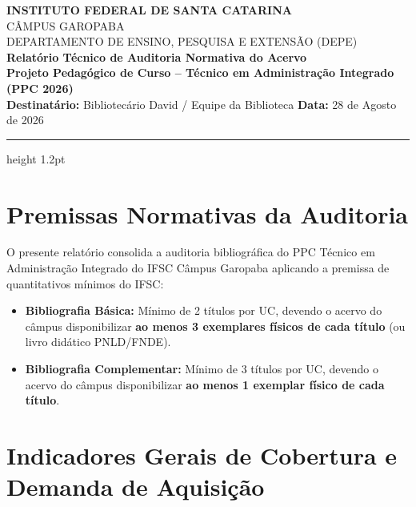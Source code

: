 \documentclass[10pt,a4paper]{article}
\begin{document}
\begin{center}
    {\large \textbf{INSTITUTO FEDERAL DE SANTA CATARINA}}\\[2pt]
    {\normalsize CÂMPUS GAROPABA}\\[2pt]
    {\small DEPARTAMENTO DE ENSINO, PESQUISA E EXTENSÃO (DEPE)}\\[10pt]
    
    {\LARGE \textbf{\textcolor{ifscgreen}{Relatório Técnico de Auditoria Normativa do Acervo}}}\\[4pt]
    {\large \textbf{Projeto Pedagógico de Curso -- Técnico em Administração Integrado (PPC 2026)}}\\[6pt]
    {\small \textbf{Destinatário:} Bibliotecário David / Equipe da Biblioteca \quad \textbullet{} \quad \textbf{Data:} 28 de Agosto de 2026}
\end{center}

\vspace{0.2cm}
\hrule height 1.2pt \relax
\vspace{0.3cm}

\section{Premissas Normativas da Auditoria}
O presente relatório consolida a auditoria bibliográfica do PPC Técnico em Administração Integrado do IFSC Câmpus Garopaba aplicando a premissa de quantitativos mínimos do IFSC:
\begin{itemize}[leftmargin=*,noitemsep]
    \item \textbf{Bibliografia Básica:} Mínimo de 2 títulos por UC, devendo o acervo do câmpus disponibilizar \textbf{ao menos 3 exemplares físicos de cada título} (ou livro didático PNLD/FNDE).
    \item \textbf{Bibliografia Complementar:} Mínimo de 3 títulos por UC, devendo o acervo do câmpus disponibilizar \textbf{ao menos 1 exemplar físico de cada título}.
\end{itemize}

\section{Indicadores Gerais de Cobertura e Demanda de Aquisição}
\end{document}
